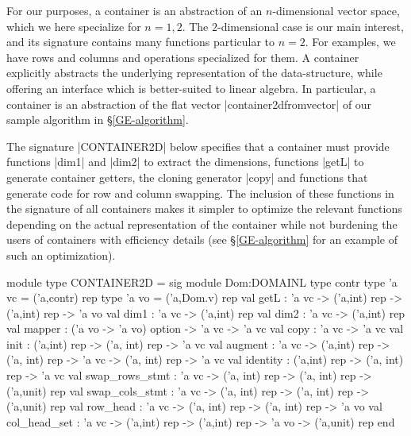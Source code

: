 \documentclass{elsart}
\begin{document}
For our purposes, a container is an abstraction of an $n$-dimensional
vector space, which we here specialize for $n=1,2$.  The
$2$-dimensional case is our main interest, and its signature contains
many functions particular to $n=2$.  For examples, we have rows and
columns and operations specialized for them.  A container explicitly
abstracts the underlying representation of the data-structure, while
offering an interface which is better-suited to linear algebra. In
particular, a container is an abstraction of the flat vector
|container2dfromvector| of our sample algorithm in
\S\ref{GE-algorithm}.

The signature |CONTAINER2D| below specifies that a container must
provide functions |dim1| and |dim2| to extract the dimensions,
functions |getL| to generate container getters, the cloning generator
|copy| and functions that generate code for row and column
swapping. The inclusion of these functions in the signature of all
containers makes it simpler to optimize the relevant functions
depending on the actual representation of the container while not
burdening the users of containers with efficiency details (see
\S\ref{GE-algorithm} for an example of such an optimization).
\begin{code}
module type CONTAINER2D = sig
  module Dom:DOMAINL
  type contr
  type 'a vc = ('a,contr) rep
  type 'a vo = ('a,Dom.v) rep
  val getL : 'a vc -> ('a,int) rep -> ('a,int) rep -> 'a vo
  val dim1 : 'a vc -> ('a,int) rep
  val dim2 : 'a vc -> ('a,int) rep
  val mapper : ('a vo -> 'a vo) option -> 'a vc -> 'a vc
  val copy : 'a vc -> 'a vc
  val init : ('a,int) rep -> ('a, int) rep -> 'a vc
  val augment : 'a vc -> ('a,int) rep -> ('a, int) rep -> 'a vc ->
                ('a, int) rep -> 'a vc
  val identity : ('a,int) rep -> ('a, int) rep -> 'a vc
  val swap_rows_stmt : 'a vc -> ('a, int) rep -> ('a, int) rep -> 
                       ('a,unit) rep
  val swap_cols_stmt : 'a vc -> ('a, int) rep -> ('a, int) rep -> 
                       ('a,unit) rep
  val row_head : 'a vc -> ('a, int) rep -> ('a, int) rep -> 'a vo
  val col_head_set : 'a vc -> ('a,int) rep -> ('a,int) rep -> 'a vo -> 
            ('a,unit) rep
end
\end{code}
\end{document}
